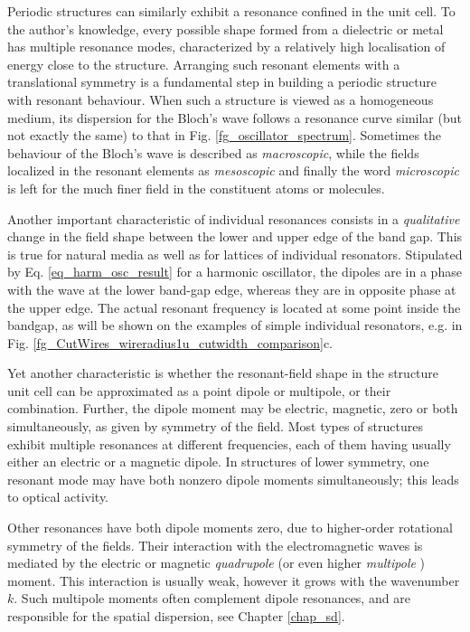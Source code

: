 Periodic structures can similarly exhibit a resonance confined in the unit cell. 
To the author's knowledge,  %
every possible shape formed from a dielectric or metal has multiple resonance modes,  %
characterized by a relatively high localisation of energy close to the structure. %
Arranging such resonant elements with a translational symmetry is a fundamental step in building a periodic structure with resonant behaviour. When such a structure is viewed as a homogeneous medium, its dispersion for the Bloch's wave follows a resonance curve similar (but not exactly the same) to that in Fig. \ref{fg_oscillator_spectrum}. Sometimes the behaviour of the Bloch's wave is described as \textit{macroscopic}, while the fields localized in the resonant elements as \textit{mesoscopic} \cite{felbacq2005theory} and finally the word \textit{microscopic} is left for the much finer field in the constituent atoms or molecules.

Another important characteristic of individual resonances consists in a \textit{qualitative} change in the field shape between the lower and upper edge of the band gap. This is true for natural media as well as for lattices of individual resonators. Stipulated by Eq. \ref{eq_harm_osc_result} for a harmonic oscillator, the dipoles are in a phase with the wave at the lower band-gap edge, whereas they are in opposite phase at the upper edge.  %
The actual resonant frequency is located at some point inside the bandgap, as will be shown on the examples of simple individual resonators, e.g. in Fig. \ref{fg_CutWires_wireradius1u_cutwidth_comparison}c.

Yet another characteristic is whether the resonant-field shape in the structure unit cell can be approximated as a point dipole or multipole, or their combination. Further, the dipole moment may be electric, magnetic, zero or both simultaneously, as given by symmetry of the field. Most types of structures exhibit multiple resonances at different frequencies, each of them having usually either an electric or a magnetic dipole. In structures of lower symmetry, one resonant mode may have both nonzero dipole moments simultaneously; this leads to optical activity. 

Other resonances have both dipole moments zero, due to higher-order rotational symmetry of the fields. Their interaction with the electromagnetic waves is mediated by the electric or magnetic \textit{quadrupole} (or even higher \textit{multipole} \cite{merlin2009metamaterials}) moment. This interaction is usually weak, however it grows with the wavenumber $k$. Such multipole moments often complement dipole resonances, and are responsible for the spatial dispersion, see Chapter \ref{chap_sd}. %

